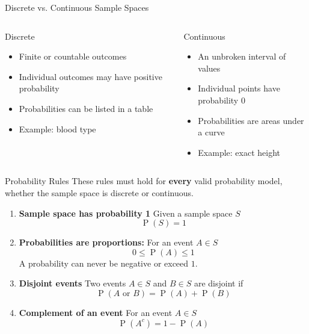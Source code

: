 \documentclass[aspectratio=169]{beamer}
\newcommand{\prob}[1]{\operatorname{P}\!\left(#1\right)}
\begin{document}
\begin{frame}{Discrete vs. Continuous Sample Spaces}
\begin{columns}[T,onlytextwidth]
\begin{block}{Discrete}
\begin{itemize}
	\item Finite or countable outcomes
	\item Individual outcomes may have positive probability
	\item Probabilities can be listed in a table
	\item Example: blood type
\end{itemize}
\end{block}

\begin{block}{Continuous}
\begin{itemize}
	\item An unbroken interval of values
  	\item Individual points have probability $0$
  	\item Probabilities are areas under a curve
  	\item Example: exact height
\end{itemize}
\end{block}
\end{columns}
\end{frame}

\begin{frame}{Probability Rules}
These rules must hold for \textbf{every} valid probability model, whether the
sample space is discrete or continuous.

\small
\begin{enumerate}
	\item \textbf{Sample space has probability 1} Given a sample space $S$
	$$\prob{S}=1$$

	\item \textbf{Probabilities are proportions:} For an event $A \in S$ 
	$$0\le \prob{A}\le 1$$
  	A probability can never be negative or exceed $1$.
	
	\item \textbf{Disjoint events} Two events $A \in S$ and $B \in S$ are disjoint if 
	$$\prob{A\text{ or }B}=\prob{A}+\prob{B}$$

	\item \textbf{Complement of an event} For an event $A \in S$
	$$\prob{A^c}=1-\prob{A}$$
\end{enumerate}
\end{frame}
\end{document}
